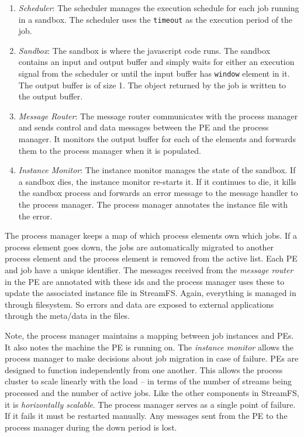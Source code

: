\begin{enumerate}
\item \emph{Scheduler}: The scheduler manages the execution schedule for each job running in a sandbox.  The scheduler uses
the \texttt{timeout} as the execution period of the job.

\item \emph{Sandbox}:  The sandbox is where the javascript code runs.  The sandbox contains an input and output buffer and simply 
waits for either an execution signal from the scheduler or until the input buffer has \texttt{window} element in it.  The output
buffer is of size 1.  The object returned by the job is written to the output buffer.

\item \emph{Message Router}:  The message router communicates with the process manager and sends control and data messages between
the PE and the process manager.  It monitors the output buffer for each of the elements and forwards them to the process manager 
when it is populated.

\item \emph{Instance Monitor}:  The instance monitor manages the state of the sandbox.  If a sandbox dies, the instance monitor re-starts
it.  If it continues to die, it kills the sandbox process and forwards an error message to the message handler to the process manager.
The process manager annotates the instance file with the error.

\end{enumerate}


The process manager keeps a map of which process elements own which jobs.  If a process element goes down, the jobs are automatically
migrated to another process element and the process element is removed from the active list.  Each PE and job have a unique identifier.
The messages received from the \emph{message router} in the PE are annotated with these ids and the process manager uses these
to update the associated instance file in StreamFS.  Again, everything is managed in through filesystem.  So errors and data
are exposed to external applications through the meta/data in the files.

Note, the process manager maintains a mapping between job instances and PEs.  It also notes the machine the PE is running on.  The
\emph{instance monitor} allows the process manager to make decisions about job migration in case of failure.  PEs are designed
to function independently from one another.  This allows the process cluster to scale linearly with the load -- in terms of
the number of streams being processed and the number of active jobs.  Like the other components in StreamFS, it is 
\emph{horizontally scalable}.  The process manager serves as a single point of failure.  If it fails it must be restarted manually.
Any messages sent from the PE to the process manager during the down period is lost.

